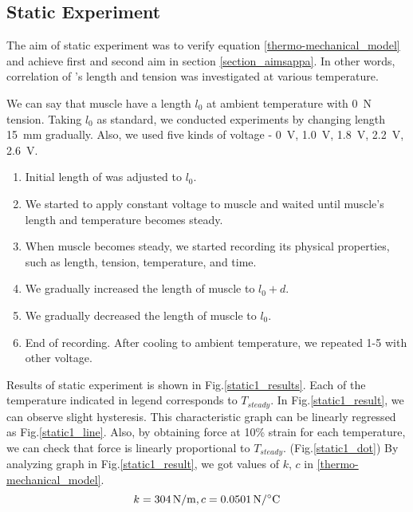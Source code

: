 \subsection{Static Experiment}
The aim of static experiment was to verify equation \eqref{thermo-mechanical_model} and achieve first and second aim in section \ref{section_aimsappa}. In other words, correlation of \scpnospace's length and tension was investigated at various temperature. 

We can say that muscle have a length $l_{0}$ at ambient temperature with \SI{0}{\newton} tension. Taking $l_{0}$ as standard, we conducted experiments by changing length \SI{15}{\milli\meter} gradually. Also, we used five kinds of voltage - \SI{0}{\volt}, \SI{1.0}{\volt}, \SI{1.8}{\volt}, \SI{2.2}{\volt}, \SI{2.6}{\volt}.

\begin{enumerate}
\item Initial length of \scp was adjusted to $l_0$.
\item We started to apply constant voltage to muscle and waited until muscle's length and temperature becomes steady.
\item When muscle becomes steady, we started recording its physical properties, such as length, tension, temperature, and time.
\item We gradually increased the length of muscle to $l_0+d$.
\item We gradually decreased the length of muscle to $l_0$.
\item End of recording. After cooling to ambient temperature, we repeated 1-5 with other voltage.
\end{enumerate}

Results of static experiment is shown in Fig.\ref{static1_results}. Each of the temperature indicated in legend corresponds to $T_{steady}$. In Fig.\ref{static1_result}, we can observe slight hysteresis. This characteristic graph can be linearly regressed as Fig.\ref{static1_line}. Also, by obtaining force at 10\% strain for each temperature, we can check that force is linearly proportional to $T_{steady}$. (Fig.\ref{static1_dot}) By analyzing graph in Fig.\ref{static1_result}, we got values of $k$, $c$ in \eqref{thermo-mechanical_model}.
\begin{equation}
k=\SI{304}{\newton\per\meter}, c=\SI{0.0501}{\newton\per\degreeCelsius} \notag
\end{equation}

